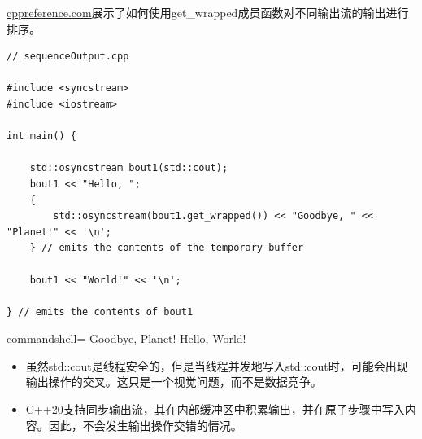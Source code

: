 \href{https://en.cppreference.com/w/cpp/io/basic_osyncstream/get_wrapped}{cppreference.com}展示了如何使用get\_wrapped成员函数对不同输出流的输出进行排序。

\begin{lstlisting}[style=styleCXX]
// sequenceOutput.cpp

#include <syncstream>
#include <iostream>

int main() {
	
	std::osyncstream bout1(std::cout);
	bout1 << "Hello, ";
	{
		std::osyncstream(bout1.get_wrapped()) << "Goodbye, " << "Planet!" << '\n';
	} // emits the contents of the temporary buffer

	bout1 << "World!" << '\n';
	
} // emits the contents of bout1
\end{lstlisting}

\begin{tcblisting}{commandshell={}}
Goodbye, Planet!
Hello, World!
\end{tcblisting}

\begin{tcolorbox}[breakable,enhanced jigsaw,colback=mygreen!5!white,colframe=mygreen!75!black,title={总结}]
	
\begin{itemize}
\item 
虽然std::cout是线程安全的，但是当线程并发地写入std::cout时，可能会出现输出操作的交叉。这只是一个视觉问题，而不是数据竞争。

\item 
C++20支持同步输出流，其在内部缓冲区中积累输出，并在原子步骤中写入内容。因此，不会发生输出操作交错的情况。
\end{itemize}
	
\end{tcolorbox}



